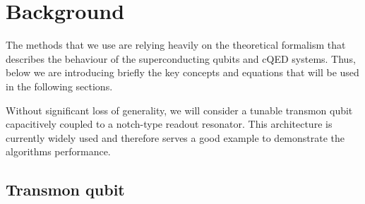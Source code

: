\documentclass[%
 aip,
 amsmath,amssymb,
 reprint,%
]{revtex4-1}
\begin{document}
\section{Background}


The methods that we use are relying heavily on the theoretical formalism that describes the behaviour of the superconducting qubits and cQED systems\cite{blais2004}. Thus, below we are introducing briefly the key concepts and equations that will be used in the following sections.

Without significant loss of generality, we will consider a tunable transmon\cite{koch2007} qubit capacitively coupled to a notch-type readout resonator. This architecture is currently widely used\cite{barends2013} and therefore serves a good example to demonstrate the algorithms performance.

\subsection{Transmon qubit}
\end{document}
